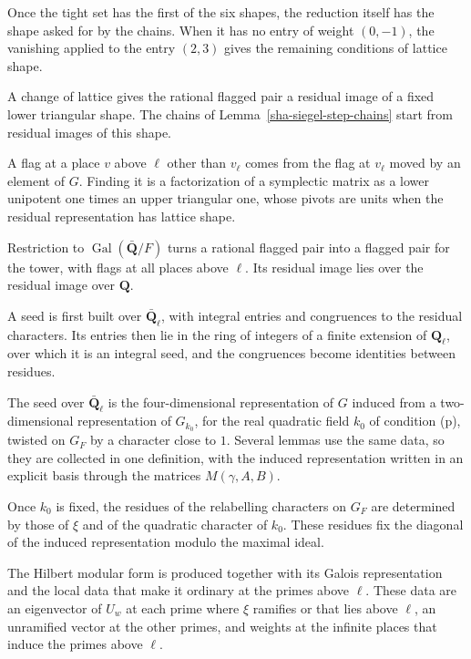 Once the tight set has the first of the six shapes, the reduction itself has the shape asked for by the chains. When it has no entry of weight $(0,-1)$, the vanishing applied to the entry $(2,3)$ gives the remaining conditions of lattice shape.

A change of lattice gives the rational flagged pair a residual image of a fixed lower triangular shape. The chains of Lemma~\ref{sha-siegel-step-chains} start from residual images of this shape.

A flag at a place $v$ above $\ell$ other than $v_\ell$ comes from the flag at $v_\ell$ moved by an element of $G$. Finding it is a factorization of a symplectic matrix as a lower unipotent one times an upper triangular one, whose pivots are units when the residual representation has lattice shape.

Restriction to $\operatorname{Gal}(\bar{\mathbf Q}/F)$ turns a rational flagged pair into a flagged pair for the tower, with flags at all places above $\ell$. Its residual image lies over the residual image over $\mathbf Q$.

A seed is first built over $\bar{\mathbf Q}_\ell$, with integral entries and congruences to the residual characters. Its entries then lie in the ring of integers of a finite extension of $\mathbf Q_\ell$, over which it is an integral seed, and the congruences become identities between residues.

The seed over $\bar{\mathbf Q}_\ell$ is the four-dimensional representation of $G$ induced from a two-dimensional representation of $G_{k_0}$, for the real quadratic field $k_0$ of condition (p), twisted on $G_F$ by a character close to $1$. Several lemmas use the same data, so they are collected in one definition, with the induced representation written in an explicit basis through the matrices $M(\gamma,A,B)$.

Once $k_0$ is fixed, the residues of the relabelling characters on $G_F$ are determined by those of $\xi$ and of the quadratic character of $k_0$. These residues fix the diagonal of the induced representation modulo the maximal ideal.

The Hilbert modular form is produced together with its Galois representation and the local data that make it ordinary at the primes above $\ell$. These data are an eigenvector of $U_w$ at each prime where $\xi$ ramifies or that lies above $\ell$, an unramified vector at the other primes, and weights at the infinite places that induce the primes above $\ell$.

